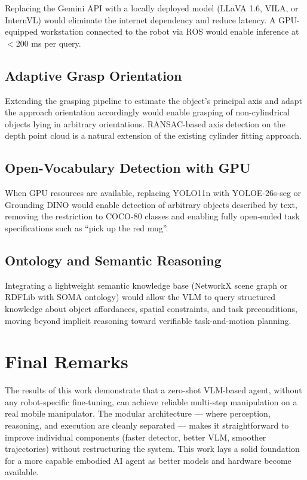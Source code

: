 Replacing the Gemini API with a locally deployed model (LLaVA 1.6, VILA, or InternVL)
would eliminate the internet dependency and reduce latency.
A GPU-equipped workstation connected to the robot via ROS would enable inference at
$<$200 ms per query.

\subsection{Adaptive Grasp Orientation}

Extending the grasping pipeline to estimate the object's principal axis and adapt
the approach orientation accordingly would enable grasping of non-cylindrical objects
lying in arbitrary orientations.
RANSAC-based axis detection on the depth point cloud is a natural extension of the
existing cylinder fitting approach.

\subsection{Open-Vocabulary Detection with GPU}

When GPU resources are available, replacing YOLO11n with YOLOE-26s-seg or
Grounding DINO would enable detection of arbitrary objects described by text,
removing the restriction to COCO-80 classes and enabling fully open-ended task
specifications such as ``pick up the red mug''.

\subsection{Ontology and Semantic Reasoning}

Integrating a lightweight semantic knowledge base (NetworkX scene graph or RDFLib
with SOMA ontology) would allow the VLM to query structured knowledge about object
affordances, spatial constraints, and task preconditions, moving beyond implicit
reasoning toward verifiable task-and-motion planning.

\section{Final Remarks}

The results of this work demonstrate that a zero-shot VLM-based agent, without any
robot-specific fine-tuning, can achieve reliable multi-step manipulation on a real
mobile manipulator.
The modular architecture — where perception, reasoning, and execution are cleanly
separated — makes it straightforward to improve individual components (faster detector,
better VLM, smoother trajectories) without restructuring the system.
This work lays a solid foundation for a more capable embodied AI agent as better
models and hardware become available.
